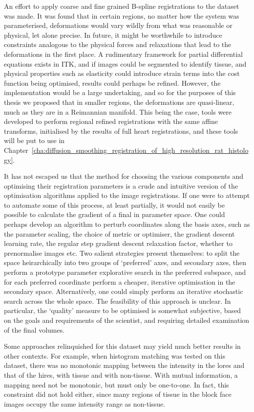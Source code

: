 	An effort to apply coarse and fine grained B-spline registrations to the dataset was made. It was found that in certain regions, no matter how the system was parameterised, deformations would vary wildly from what was reasonable or physical, let alone precise. In future, it might be worthwhile to introduce constraints analogous to the physical forces and relaxations that lead to the deformations in the first place. A rudimentary framework for partial differential equations exists in ITK, and if images could be segmented to identify tissue, and physical properties such as elasticity could introduce strain terms into the cost function being optimised, results could perhaps be refined. However, the implementation would be a large undertaking, and so for the purposes of this thesis we proposed that in smaller regions, the deformations are quasi-linear, much as they are in a Reimannian manifold. This being the case, tools were developed to perform regional refined registrations with the same affine transforms, initialised by the results of full heart registrations, and these tools will be put to use in Chapter~\ref{cha:diffusion_smoothing_registration_of_high_resolution_rat_histology}.
    
  It has not escaped us that the method for choosing the various components and optimising their registration parameters is a crude and intuitive version of the optimisation algorithms applied to the image registrations. If one were to attempt to automate some of this process, at least partially, it would not easily be possible to calculate the gradient of a final in parameter space. One could perhaps develop an algorithm to perturb coordinates along the basis axes, such as the parameter scaling, the choice of metric or optimiser, the gradient descent learning rate, the regular step gradient descent relaxation factor, whether to prenormalise images etc. Two salient strategies present themselves: to split the space heirarchically into two groups of `preferred' axes, and secondary axes, then perform a prototype parameter explorative search in the preferred subspace, and for each preferred coordinate perform a cheaper, iterative optimisation in the secondary space. Alternatively, one could simply perform an iterative stochastic search across the whole space. The feasibility of this approach is unclear. In particular, the `quality' measure to be optimised is somewhat subjective, based on the goals and requirements of the scientist, and requiring detailed examination of the final volumes.
  
  Some approaches relinquished for this dataset may yield much better results in other contexts. For example, when histogram matching was tested on this dataset, there was no monotonic mapping between the intensity in the lores and that of the hires, with tissue and with non-tissue. With mutual information, a mapping need not be monotonic, but must only be one-to-one. In fact, this constraint did not hold either, since many regions of tissue in the block face images occupy the same intensity range as non-tissue.
	
